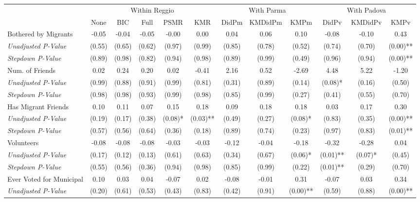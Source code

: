 \begin{tabular}{l c c c c c c c c c c c}
\toprule
& \multicolumn{5}{c}{Within Reggio} & \multicolumn{3}{c}{With Parma} & \multicolumn{3}{c}{With Padova} \\\cmidrule(lr){2-6} \cmidrule(lr){7-9} \cmidrule(lr){10-12}
 & None & BIC & Full & PSMR & KMR & DidPm & KMDidPm & KMPm & DidPv & KMDidPv & KMPv \\
\midrule
Bothered by Migrants & -0.05 & -0.04 & -0.05 & -0.00 & 0.00 & 0.04 & 0.06 & 0.10 & -0.08 & -0.10 & 0.43 \\
\quad \textit{Unadjusted P-Value} & (0.55) & (0.65) & (0.62) & (0.97) & (0.99) & (0.85) & (0.78) & (0.52) & (0.74) & (0.70) & (0.00)** \\
\quad \textit{Stepdown P-Value} & (0.89) & (0.98) & (0.82) & (0.94) & (0.98) & (0.89) & (0.99) & (0.49) & (0.96) & (0.94) & (0.00)** \\
Num. of Friends & 0.02 & 0.24 & 0.20 & 0.02 & -0.41 & 2.16 & 0.52 & -2.69 & 4.48 & 5.22 & -1.20 \\
\quad \textit{Unadjusted P-Value} & (0.99) & (0.88) & (0.91) & (0.99) & (0.81) & (0.31) & (0.89) & (0.14) & (0.08)* & (0.16) & (0.50) \\
\quad \textit{Stepdown P-Value} & (0.98) & (0.98) & (0.93) & (0.99) & (0.98) & (0.85) & (0.99) & (0.27) & (0.41) & (0.55) & (0.70) \\
Has Migrant Friends & 0.10 & 0.11 & 0.07 & 0.15 & 0.18 & 0.09 & 0.18 & 0.18 & 0.03 & 0.17 & 0.30 \\
\quad \textit{Unadjusted P-Value} & (0.19) & (0.17) & (0.38) & (0.08)* & (0.03)** & (0.49) & (0.27) & (0.08)* & (0.83) & (0.35) & (0.00)** \\
\quad \textit{Stepdown P-Value} & (0.57) & (0.56) & (0.64) & (0.36) & (0.18) & (0.89) & (0.74) & (0.23) & (0.97) & (0.83) & (0.01)** \\
Volunteers & -0.08 & -0.08 & -0.08 & -0.03 & -0.03 & -0.12 & -0.04 & -0.18 & -0.32 & -0.28 & 0.04 \\
\quad \textit{Unadjusted P-Value} & (0.17) & (0.12) & (0.13) & (0.61) & (0.63) & (0.34) & (0.67) & (0.06)* & (0.01)** & (0.07)* & (0.45) \\
\quad \textit{Stepdown P-Value} & (0.55) & (0.56) & (0.36) & (0.94) & (0.98) & (0.85) & (0.99) & (0.22) & (0.01)** & (0.29) & (0.70) \\
Ever Voted for Municipal & 0.10 & 0.03 & 0.04 & -0.07 & 0.02 & -0.08 & -0.01 & 0.31 & -0.07 & 0.03 & 0.34 \\
\quad \textit{Unadjusted P-Value} & (0.20) & (0.61) & (0.53) & (0.43) & (0.83) & (0.42) & (0.91) & (0.00)** & (0.59) & (0.88) & (0.00)** \\

\end{tabular}
